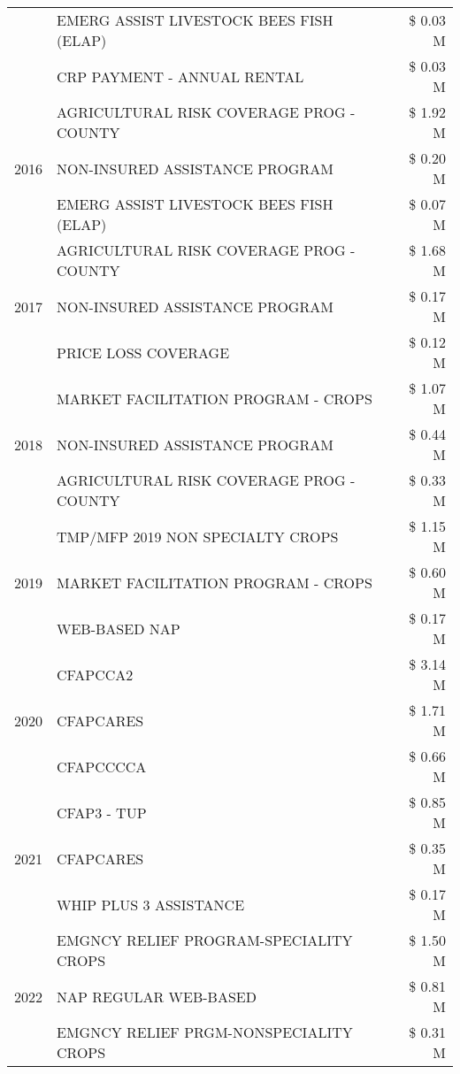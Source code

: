 \begin{tabular}{llr}
 & EMERG ASSIST LIVESTOCK BEES FISH (ELAP) & \$ 0.03 M \\
 & CRP PAYMENT - ANNUAL RENTAL & \$ 0.03 M \\
\cline{1-3}
\multirow[t]{3}{*}{2016} & AGRICULTURAL RISK COVERAGE PROG - COUNTY & \$ 1.92 M \\
 & NON-INSURED ASSISTANCE PROGRAM & \$ 0.20 M \\
 & EMERG ASSIST LIVESTOCK BEES FISH (ELAP) & \$ 0.07 M \\
\cline{1-3}
\multirow[t]{3}{*}{2017} & AGRICULTURAL RISK COVERAGE PROG - COUNTY & \$ 1.68 M \\
 & NON-INSURED ASSISTANCE PROGRAM & \$ 0.17 M \\
 & PRICE LOSS COVERAGE & \$ 0.12 M \\
\cline{1-3}
\multirow[t]{3}{*}{2018} & MARKET FACILITATION PROGRAM - CROPS & \$ 1.07 M \\
 & NON-INSURED ASSISTANCE PROGRAM & \$ 0.44 M \\
 & AGRICULTURAL RISK COVERAGE PROG - COUNTY & \$ 0.33 M \\
\cline{1-3}
\multirow[t]{3}{*}{2019} & TMP/MFP 2019 NON SPECIALTY CROPS & \$ 1.15 M \\
 & MARKET FACILITATION PROGRAM - CROPS & \$ 0.60 M \\
 & WEB-BASED NAP & \$ 0.17 M \\
\cline{1-3}
\multirow[t]{3}{*}{2020} & CFAPCCA2 & \$ 3.14 M \\
 & CFAPCARES & \$ 1.71 M \\
 & CFAPCCCCA & \$ 0.66 M \\
\cline{1-3}
\multirow[t]{3}{*}{2021} & CFAP3 - TUP & \$ 0.85 M \\
 & CFAPCARES & \$ 0.35 M \\
 & WHIP PLUS 3 ASSISTANCE & \$ 0.17 M \\
\cline{1-3}
\multirow[t]{3}{*}{2022} & EMGNCY RELIEF PROGRAM-SPECIALITY CROPS & \$ 1.50 M \\
 & NAP REGULAR WEB-BASED & \$ 0.81 M \\
 & EMGNCY RELIEF PRGM-NONSPECIALITY CROPS & \$ 0.31 M \\
\cline{1-3}
\bottomrule
\end{tabular}
